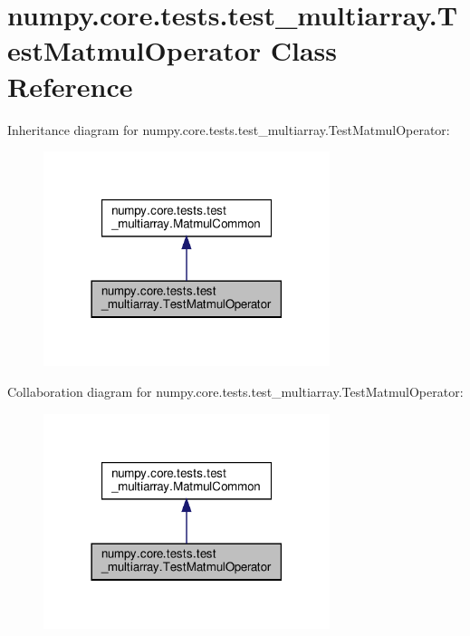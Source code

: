 \hypertarget{classnumpy_1_1core_1_1tests_1_1test__multiarray_1_1TestMatmulOperator}{}\section{numpy.\+core.\+tests.\+test\+\_\+multiarray.\+Test\+Matmul\+Operator Class Reference}
\label{classnumpy_1_1core_1_1tests_1_1test__multiarray_1_1TestMatmulOperator}


Inheritance diagram for numpy.\+core.\+tests.\+test\+\_\+multiarray.\+Test\+Matmul\+Operator\+:
\nopagebreak
\begin{figure}[H]
\begin{center}
\leavevmode
\includegraphics[width=237pt]{classnumpy_1_1core_1_1tests_1_1test__multiarray_1_1TestMatmulOperator__inherit__graph}
\end{center}
\end{figure}


Collaboration diagram for numpy.\+core.\+tests.\+test\+\_\+multiarray.\+Test\+Matmul\+Operator\+:
\nopagebreak
\begin{figure}[H]
\begin{center}
\leavevmode
\includegraphics[width=237pt]{classnumpy_1_1core_1_1tests_1_1test__multiarray_1_1TestMatmulOperator__coll__graph}
\end{center}
\end{figure}
